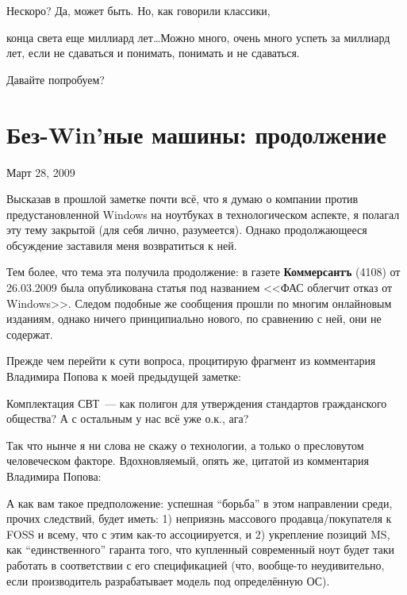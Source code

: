 Нескоро? Да, может быть. Но, как говорили классики,


\begin{shadequote}{}
 конца света еще миллиард лет\dots Можно много, очень много успеть за миллиард лет, если не сдаваться и понимать, понимать и не сдаваться.
\end{shadequote}

Давайте попробуем?

\section{Без-Win’ные машины: продолжение} 

\begin{timeline}Март 28, 2009\end{timeline}

Высказав в прошлой заметке почти всё, что я думаю о компании против предустановленной Windows на ноутбуках в технологическом аспекте, я полагал эту тему закрытой (для себя лично, разумеется). Однако продолжающееся обсуждение заставиля меня возвратиться к ней.

Тем более, что тема эта получила продолжение: в газете \textbf{Коммерсантъ}  (4108) от 26.03.2009 была опубликована  статья под названием <<ФАС облегчит отказ от Windows>>. Следом подобные же сообщения прошли по многим онлайновым изданиям, однако ничего принципиально нового, по сравнению с ней, они не содержат.

Прежде чем перейти к сути вопроса, процитирую фрагмент из комментария Владимира Попова к моей предыдущей заметке:


\begin{shadequote}{}
Комплектация СВТ~--- как полигон для утверждения стандартов гражданского общества? А с остальным у нас всё уже о.к., ага?
\end{shadequote}

Так что нынче я ни слова не скажу о технологии, а только о пресловутом человеческом факторе. Вдохновляемый, опять же, цитатой из комментария Владимира Попова:


\begin{shadequote}{}
А как вам такое предположение: успешная “борьба” в этом направлении среди, прочих следствий, будет иметь: 1) неприязнь массового продавца/покупателя к FOSS и всему, что с этим как-то ассоциируется, и 2) укрепление позиций MS, как “единственного” гаранта того, что купленный современный ноут будет таки работать в соответствии с его спецификацией (что, вообще-то неудивительно, если производитель разрабатывает модель под определённую ОС).
\end{shadequote}



